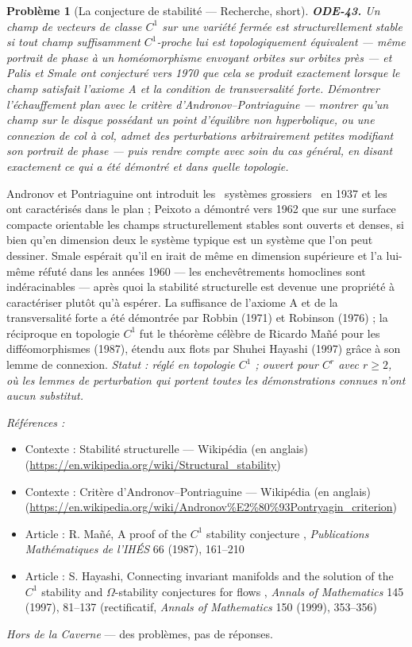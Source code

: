 \documentclass[11pt]{article}
\newtheorem{problem}{Problème}
\newenvironment{refs}{\par\small\noindent\emph{Références :}\begin{itemize}\setlength\itemsep{0pt}}{\end{itemize}\normalsize}
\begin{document}
\begin{problem}[{La conjecture de stabilité --- Recherche, short}]
\textbf{ODE-43.} Un champ de vecteurs de classe $ C^1 $ sur une variété
fermée est \textit{structurellement stable} si tout champ suffisamment $ C^1 $-proche lui est
topologiquement équivalent --- même portrait de phase à un homéomorphisme envoyant orbites sur
orbites près --- et Palis et Smale ont conjecturé vers 1970 que cela se produit exactement lorsque le
champ satisfait l'axiome A et la condition de transversalité forte. Démontrer l'échauffement plan
avec le critère d'Andronov--Pontriaguine --- montrer qu'un champ sur le disque possédant un point
d'équilibre non hyperbolique, ou une connexion de col à col, admet des perturbations
arbitrairement petites modifiant son portrait de phase --- puis rendre compte avec soin du cas
général, en disant exactement ce qui a été démontré et dans quelle topologie.
\end{problem}

\noindent Andronov et Pontriaguine ont introduit les \og{}~systèmes
grossiers~\fg{} en 1937 et les ont caractérisés dans le plan ; Peixoto a démontré vers 1962
que sur une surface compacte orientable les champs structurellement stables sont ouverts et
denses, si bien qu'en dimension deux le système typique est un système que l'on peut dessiner.
Smale espérait qu'il en irait de même en dimension supérieure et l'a lui-même réfuté dans les
années 1960 --- les enchevêtrements homoclines sont indéracinables --- après quoi la stabilité
structurelle est devenue une propriété à caractériser plutôt qu'à espérer. La suffisance de
l'axiome A et de la transversalité forte a été démontrée par Robbin (1971) et Robinson (1976) ; la
réciproque en topologie $ C^1 $ fut le théorème célèbre de Ricardo Mañé pour les
difféomorphismes (1987), étendu aux flots par Shuhei Hayashi (1997) grâce à son lemme de
connexion. \textit{Statut : réglé en topologie $ C^1 $ ; ouvert pour $ C^r $ avec $ r \ge 2 $, où
les lemmes de perturbation qui portent toutes les démonstrations connues n'ont aucun
substitut.}

\begin{refs}
\item Contexte : Stabilité structurelle --- Wikipédia (en anglais) (\url{https://en.wikipedia.org/wiki/Structural_stability})
\item Contexte : Critère d'Andronov--Pontriaguine --- Wikipédia (en anglais) (\url{https://en.wikipedia.org/wiki/Andronov%E2%80%93Pontryagin_criterion})
\item Article : R. Mañé, \og{} A proof of the $ C^1 $ stability conjecture \fg{}, \textit{Publications Mathématiques de l'IHÉS} 66 (1987), 161--210
\item Article : S. Hayashi, \og{} Connecting invariant manifolds and the solution of the $ C^1 $ stability and $\Omega$-stability conjectures for flows \fg{}, \textit{Annals of Mathematics} 145 (1997), 81--137 (rectificatif, \textit{Annals of Mathematics} 150 (1999), 353--356)
\end{refs}

\bigskip


\vfill
\noindent\emph{Hors de la Caverne} --- des probl\`emes, pas de r\'eponses.
\end{document}
